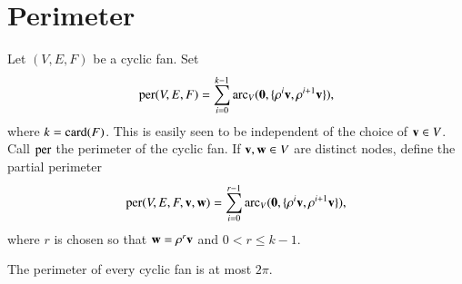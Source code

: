 



\section{Perimeter}


\begin{definition}[perimeter]\label{lemma:perim}
Let $(V,E,F)$ be a cyclic fan.    Set
$$
{\operatorname{per}}(V,E,F) = \sum_{i=0}^{k-1} \operatorname{arc}_V({\mathbf 0},\{\rho^i {\mathbf v},\rho^{i+1} {\mathbf v}\}), 
$$
where  $k={\operatorname{card}}(F)$.
This is easily seen to be independent of the choice of ${\mathbf v}\in V$.  Call ${\operatorname{per}}$ the perimeter of the cyclic fan.
If ${\mathbf v},{\mathbf w}\in V$ are distinct nodes, define the partial perimeter 
$$
{\operatorname{per}}(V,E,F,{\mathbf v},{\mathbf w}) = \sum_{i=0}^{r-1} \operatorname{arc}_V({\mathbf 0},\{\rho^i {\mathbf v},\rho^{i+1} {\mathbf v}\}), 
$$
where $r$ is chosen so that ${\mathbf w}=\rho^r {\mathbf v}$ and $0<r\le k-1$.
\end{definition}
%
%
%



\begin{lemma}
 The perimeter of every cyclic fan is at most $2\pi$.
\end{lemma}
%
%

